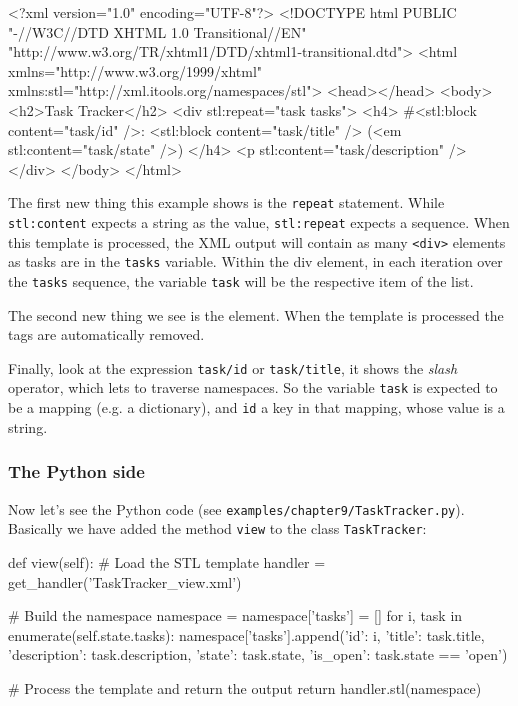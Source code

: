 \begin{code}
    <?xml version="1.0" encoding="UTF-8"?>
    <!DOCTYPE html
         PUBLIC "-//W3C//DTD XHTML 1.0 Transitional//EN"
         "http://www.w3.org/TR/xhtml1/DTD/xhtml1-transitional.dtd">
    <html xmlns="http://www.w3.org/1999/xhtml"
          xmlns:stl="http://xml.itools.org/namespaces/stl">
      <head></head>
      <body>
        <h2>Task Tracker</h2>
        <div stl:repeat="task tasks">
          <h4>
            #<stl:block content="task/id" />:
            <stl:block content="task/title" />
            (<em stl:content="task/state" />)
          </h4>
          <p stl:content="task/description" />
        </div>
      </body>
    </html>
\end{code}

The first new thing this example shows is the {\tt repeat} statement. While
{\tt stl:content} expects a string as the value, {\tt stl:repeat} expects a
sequence. When this template is processed, the XML output will contain as
many {\tt <div>} elements as tasks are in the {\tt tasks} variable. Within
the div element, in each iteration over the {\tt tasks} sequence, the
variable {\tt task} will be the respective item of the list.

The second new thing we see is the {\tt <stl:block>} element. When the
template is processed the {\tt <stl:block>} tags are automatically
removed.

Finally, look at the expression {\tt task/id} or {\tt task/title}, it shows
the {\em slash} operator, which lets to traverse namespaces. So the variable
{\tt task} is expected to be a mapping (e.g. a dictionary), and
{\tt id} a key in that mapping, whose value is a string.

\subsubsection{The Python side}

Now let's see the Python code (see {\tt examples/chapter9/TaskTracker.py}).
Basically we have added the method {\tt view} to the class {\tt TaskTracker}:

\begin{code}
    def view(self):
        # Load the STL template
        handler = get_handler('TaskTracker_view.xml')

        # Build the namespace
        namespace = {}
        namespace['tasks'] = []
        for i, task in enumerate(self.state.tasks):
            namespace['tasks'].append({'id': i,
                                       'title': task.title,
                                       'description': task.description,
                                       'state': task.state,
                                       'is_open': task.state == 'open'})

        # Process the template and return the output
        return handler.stl(namespace)
\end{code}

